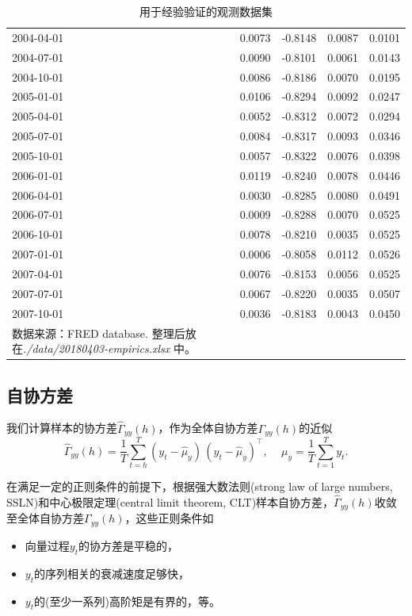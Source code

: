 \begin{longtable}{p{}|p{}p{}p{}p{}}
        2004-04-01	&0.0073	&-0.8148	&0.0087	&0.0101\\
        2004-07-01	&0.0090	&-0.8101	&0.0061	&0.0143\\
        2004-10-01	&0.0086	&-0.8186	&0.0070	&0.0195\\
        2005-01-01	&0.0106	&-0.8294	&0.0092	&0.0247\\
        2005-04-01	&0.0052	&-0.8312	&0.0072	&0.0294\\
        2005-07-01	&0.0084	&-0.8317	&0.0093	&0.0346\\
        2005-10-01	&0.0057	&-0.8322	&0.0076	&0.0398\\
        2006-01-01	&0.0119	&-0.8240	&0.0078	&0.0446\\
        2006-04-01	&0.0030	&-0.8285	&0.0080	&0.0491\\
        2006-07-01	&0.0009	&-0.8288	&0.0070	&0.0525\\
        2006-10-01	&0.0078	&-0.8210	&0.0035	&0.0525\\
        2007-01-01	&0.0006	&-0.8058	&0.0112	&0.0526\\
        2007-04-01	&0.0076	&-0.8153	&0.0056	&0.0525\\
        2007-07-01	&0.0067	&-0.8220	&0.0035	&0.0507\\
        2007-10-01	&0.0036	&-0.8183	&0.0043	&0.0450\\
        \hline
      \caption{用于经验验证的观测数据集}

      \small{数据来源：FRED database. 整理后放在\textit{./data/20180403-empirics.xlsx} 中。}
        \label{tab:stylized-ssrep-empirics-data}
\end{longtable}

\subsection{自协方差}
\label{sec:stylized-ssrep-empirics-var}

我们计算样本的协方差$\widehat{\Gamma}_{yy} \left(h \right)$，作为全体自协方差$\Gamma_{yy} \left(h \right)$的近似
\begin{equation}
  \label{eq:stylized-ssrep-empirics-autocovar}
  \widehat{\Gamma}_{yy} \left( h \right) = \frac{1}{T}
  \sum_{t=h}^{T} \left( y_{t} - \hat{\mu}_{y} \right) \,
  \left( y_{t} - \hat{\mu}_{y} \right)^{\top}, \quad \, \mu_{y} = \frac{1}{T} \sum_{t=1}^{T} y_{t}.
\end{equation}

在满足一定的正则条件的前提下，根据强大数法则(strong law of large numbers, SSLN)和中心极限定理(central limit theorem, CLT)样本自协方差，$\widehat{\Gamma}_{yy} \left(h \right)$收敛至全体自协方差$\Gamma_{yy} \left(h \right)$，这些正则条件如
\begin{itemize}
  \item 向量过程$y_{t}$的协方差是平稳的，
  \item $y_{t}$的序列相关的衰减速度足够快，
  \item $y_{t}$的(至少一系列)高阶矩是有界的，等。
\end{itemize}

